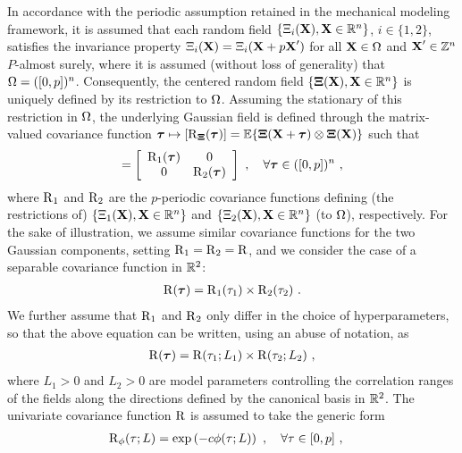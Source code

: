 In accordance with the periodic assumption retained in the mechanical modeling framework, it is assumed that each random field $\{\Xi_i(\textbf{X}), \textbf{X} \in \mathbb{R}^n\}$, $i \in \{1,2\}$, satisfies the invariance property $\Xi_i(\textbf{X}) = \Xi_i(\textbf{X}+p\textbf{X}')$ for all $\textbf{X} \in \Omega$ and $\textbf{X}' \in \mathbb{Z}^n$
$P$-almost surely, where it is assumed (without loss of generality) that $\Omega = ([0,p])^n$. Consequently, the centered random field $\{\boldsymbol{\Xi}(\textbf{X}), \textbf{X} \in \mathbb{R}^n\}$ is uniquely defined by its restriction to $\Omega$.  Assuming the stationary of this restriction in $\Omega$, the underlying Gaussian field is defined through the matrix-valued covariance function $\boldsymbol{\tau} \mapsto [\operatorname{R}_{\boldsymbol{\Xi}}(\boldsymbol{\tau})] = \mathbb{E}\{\boldsymbol{\Xi}(\textbf{X}+\boldsymbol{\tau}) \otimes \boldsymbol{\Xi}(\textbf{X})\}$
such that
\begin{align}
  [\cor_{\bs{\Xi}}(\bs{\tau})] = \left[\begin{array}{cc}\cor_1(\bs{\tau}) & 0 \\0 & \cor_2(\bs{\tau}) \end{array}\right]~, \quad \forall \bs{\tau} \in ([0,p])^n~,
\end{align}
where $\operatorname{R}_1$ and $\operatorname{R}_2$ are the $p$-periodic covariance functions defining (the restrictions of) $\{\Xi_1(\textbf{X}), \textbf{X} \in \mathbb{R}^n\}$ and $\{\Xi_2(\textbf{X}), \textbf{X} \in \mathbb{R}^n\}$ (to $\Omega$), respectively.
For the sake of illustration, we assume similar covariance functions for the two Gaussian components, setting $\operatorname{R}_1 = \operatorname{R}_2 = \operatorname{R}$,
and we consider the case of a separable covariance function in $\mathbb{R}^2$:
\begin{align}
  \operatorname{R}(\boldsymbol{\tau}) = \operatorname{R}_1(\tau_1) \times \operatorname{R}_2(\tau_2)~. \label{eq: composite covariance function}
\end{align}
We further assume that $\operatorname{R}_1$ and $\operatorname{R}_2$ only differ in the choice of hyperparameters, so that the above equation can be written, using an abuse of notation, as
\begin{align}
  \operatorname{R}(\boldsymbol{\tau}) = \operatorname{R}(\tau_1;L_1) \times \operatorname{R}(\tau_2;L_2)~,
\end{align}
where $L_1 > 0$ and $L_2 > 0$ are model parameters controlling the correlation ranges of the fields along the directions defined by the canonical basis in $\mathbb{R}^2$. The univariate covariance function $\operatorname{R}$ is assumed to take the generic form
\begin{align}
  \operatorname{R}_\phi(\tau; L) & = \exp\left( -c \phi(\tau; L)\right )~, \quad \forall \tau \in [0,p]~, \label{eq: def-generic-cov} 
\end{align}
